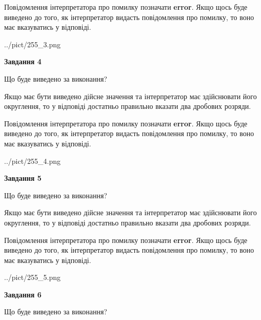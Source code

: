 \documentclass[12pt, ukrainian]{article}
\begin{document}
{\begin {Large}
Повідомлення інтерпретатора про помилку позначати \textbf{error}.
Якщо щось буде виведено до того, як інтерпретатор видасть повідомлення про помилку, 
то воно має вказуватись у відповіді. \par

\begin{center}
	{../pict/255_3.png}
\end{center}
\newpage

{\begin {center}\textbf{Завдання 4}\end {center}}\par
Що буде виведено за виконання? \par

Якщо має бути виведено дійсне значення та інтерпретатор має здійснювати його округлення, 
то у відповіді достатньо правильно вказати два дробових розряди.

Повідомлення інтерпретатора про помилку позначати \textbf{error}.
Якщо щось буде виведено до того, як інтерпретатор видасть повідомлення про помилку, 
то воно має вказуватись у відповіді. \par

\begin{center}
	{../pict/255_4.png}
\end{center}
\newpage

{\begin {center}\textbf{Завдання 5}\end {center}}\par
Що буде виведено за виконання? \par

Якщо має бути виведено дійсне значення та інтерпретатор має здійснювати його округлення, 
то у відповіді достатньо правильно вказати два дробових розряди.

Повідомлення інтерпретатора про помилку позначати \textbf{error}.
Якщо щось буде виведено до того, як інтерпретатор видасть повідомлення про помилку, 
то воно має вказуватись у відповіді. \par

\begin{center}
	{../pict/255_5.png}
\end{center}
\newpage

{\begin {center}\textbf{Завдання 6}\end {center}}\par
Що буде виведено за виконання? \par


\end{Large}}
\end{document}
